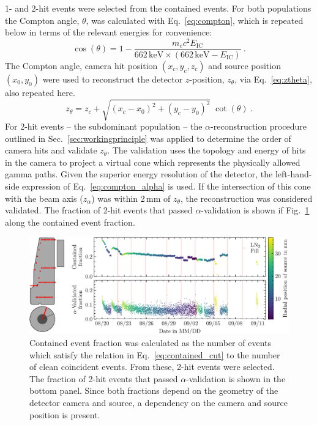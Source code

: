 1- and 2-hit events were selected from the contained events. For both populations the Compton angle, $\theta$, was calculated with Eq.~\ref{eq:compton}, which is repeated below in terms of the relevant energies for convenience:
\begin{equation} \label{eq:compton_IC}
    \cos(\theta) = 1 - \dfrac{m_ec^2 E_\text{IC}}{662\,\text{keV} \times \left(662\,\text{keV} - E_\text{IC}\right)}~.
\end{equation}
The Compton angle, camera hit position $(x_c,y_c,z_c)$ and \CsS{} source position $(x_0,y_0)$ were used to reconstruct the detector $z$-position, $z_\theta$, via Eq.~\ref{eq:ztheta}, also repeated here. 
\begin{equation} \label{eq:ztheta_IC}
	z_\theta = z_c + \sqrt{(x_c-x_0)^2 + (y_c-y_0)^2} \;\cot(\theta)~. 
 \end{equation}
For 2-hit events -- the subdominant population -- the $\alpha$-reconstruction procedure outlined in Sec.~\ref{sec:workingprinciple} was applied to determine the order of camera hits and validate $z_\theta$. The validation uses the topology and energy of hits in the camera to project a virtual cone which represents the physically allowed gamma paths. Given the superior energy resolution of the detector, the left-hand-side expression of Eq.~\ref{eq:compton_alpha} is used. If the intersection of this cone with the beam axis ($z_\alpha$) was within 2\,mm of $z_\theta$, the reconstruction was considered validated. The fraction of 2-hit events that passed $\alpha$-validation is shown if Fig.~\ref{fig:compton_stability} along the contained event fraction. 
\begin{figure}[htb]
    \centering
    \includegraphics[width=6in]{figs/pipeline/compton_stability.pdf}
    \caption{Contained event fraction was calculated as the number of events which satisfy the relation in Eq.~\ref{eq:contained_cut} to the number of clean coincident events. From these, 2-hit events were selected. The fraction of 2-hit events that passed $\alpha$-validation is shown in the bottom panel. Since both fractions depend on the geometry of the detector camera and source, a dependency on the camera and source position is present.}
    \label{fig:compton_stability}
\end{figure}

